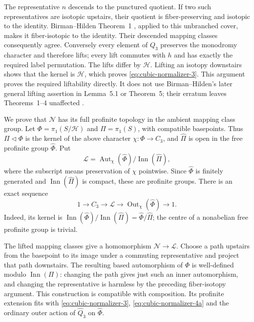 The representative $n$ descends to the punctured quotient.
If two such representatives are isotopic upstairs, their
quotient is fiber-preserving and isotopic to the identity.
Birman--Hilden Theorem~1
\cite[p.~424]{CubicBH}, applied to this unbranched cover,
makes it fiber-isotopic to the identity. Their descended
mapping classes consequently agree. Conversely every element
of $Q_3$ preserves the monodromy character and therefore
lifts; every lift commutes with $h$ and has exactly the
required label permutation. The lifts differ by $\mathcal H$.
Lifting an isotopy downstairs shows that the kernel is $\mathcal H$,
which proves \eqref{eq:cubic-normalizer-3}. This argument proves the required
liftability directly. It does not use Birman--Hilden's later
general lifting assertion in Lemma~5.1 or Theorem~5;
their erratum leaves Theorems~1--4 unaffected
\cite{CubicBHErr}.

We prove that $\mathcal N$ has its full profinite topology in the
ambient mapping class group. Let
$\Phi=\pi_1(S/\mathcal H)$ and $\Pi=\pi_1(S)$, with compatible
basepoints. Thus $\Pi\lhd\Phi$ is the kernel of the above
character $\chi:\Phi\to C_3$, and
$\widehat\Pi$ is open in the free profinite group
$\widehat\Phi$. Put
\[
 \mathcal L=
 \operatorname{Aut}_{\chi}(\widehat\Phi)
                 /\operatorname{Inn}(\widehat\Pi),
\]
where the subscript means preservation of $\chi$ pointwise.
Since $\widehat\Phi$ is finitely generated and
$\operatorname{Inn}(\widehat\Pi)$ is compact, these are
profinite groups. There is an exact sequence
\begin{equation}\label{eq:cubic-normalizer-4a}
1\longrightarrow C_3\longrightarrow\mathcal L
 \longrightarrow\operatorname{Out}_{\chi}(\widehat\Phi)
 \longrightarrow1.
\end{equation}
Indeed, its kernel is
$\operatorname{Inn}(\widehat\Phi)/
\operatorname{Inn}(\widehat\Pi)=\widehat\Phi/\widehat\Pi$;
the centre of a nonabelian free profinite group is trivial.

The lifted mapping classes give a homomorphism
$\mathcal N\to\mathcal L$. Choose a path upstairs from the basepoint
to its image under a commuting representative and project
that path downstairs. The resulting based automorphism of
$\Phi$ is well-defined modulo $\operatorname{Inn}(\Pi)$:
changing the path gives just such an inner automorphism, and
changing the representative is harmless by the preceding
fiber-isotopy argument. This construction is compatible with
composition. Its profinite extension fits with \eqref{eq:cubic-normalizer-3}, \eqref{eq:cubic-normalizer-4a}
and the ordinary outer action of $\widehat Q_3$ on
$\widehat\Phi$.

